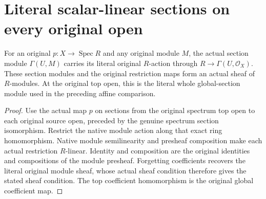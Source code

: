 \section{Literal scalar-linear sections on every original open}

\begin{lemma}
\label{lem:fc-scheme-scalar-module-presheaf}
\leanok
For an original $p:X\to\operatorname{Spec}R$ and any original module $M$,
the actual section module $\Gamma(U,M)$ carries its literal original
$R$-action through $R\to\Gamma(U,\mathcal O_X)$. These section modules
and the original restriction maps form an actual sheaf of $R$-modules.
At the original top open, this is the literal whole global-section
module used in the preceding affine comparison.
\end{lemma}
\begin{proof}
Use the actual map $p$ on sections from the original spectrum top open
to each original source open, preceded by the genuine spectrum section
isomorphism. Restrict the native module action along that exact ring
homomorphism. Native module semilinearity and presheaf composition make
each actual restriction $R$-linear. Identity and composition are the
original identities and compositions of the module presheaf.
Forgetting coefficients recovers the literal original module sheaf,
whose actual sheaf condition therefore gives the stated sheaf condition.
The top coefficient homomorphism is the original global coefficient map.
\end{proof}
